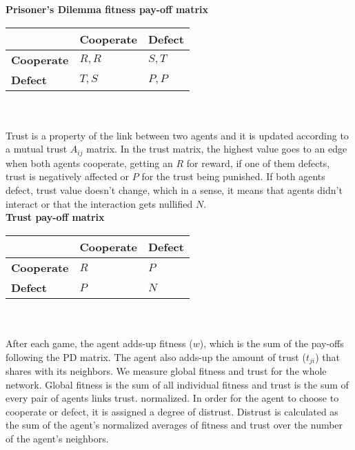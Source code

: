{\bf Prisoner's Dilemma fitness pay-off matrix}\\

\begin{tabular}{| l | l | l |}
\hline
          & \bf{Cooperate} & \bf{Defect} \\ \hline
\bf{Cooperate} &  $R,R$      &  $S,T$   \\ \hline
\bf{Defect}    &  $T,S$      &  $P,P$   \\ \hline

\end{tabular}\\ \\

Trust is a property of the link between two agents and it is updated
according to a mutual trust $A_{ij}$ matrix. In the trust matrix, the
highest value goes to an edge when both agents cooperate, getting an
$R$ for reward, if one of them defects, trust is negatively affected
or $P$ for the trust being punished. If both agents defect, trust
value doesn't change, which in a sense, it means that agents didn't
interact or that the interaction gets nullified $N$. \\

{\bf Trust pay-off matrix}\\

\begin{tabular}{| l | l | l |}
\hline
          & \bf{Cooperate} & \bf{Defect} \\ \hline
\bf{Cooperate} &  $R$      &  $P$   \\ \hline
\bf{Defect}    &  $P$      &  $N$   \\ \hline

\end{tabular}\\ \\


After each game, the agent adds-up fitness ($w$), which is the sum of the
pay-offs following the PD matrix. The agent also adds-up the amount of
trust ($t_{ji}$) that shares with its neighbors. We measure global
fitness and trust for the whole network. Global fitness is the sum of
all individual fitness and trust is the sum of every pair of agents
links trust. normalized. In order for the agent to choose to cooperate
or defect, it is assigned a degree of distrust. Distrust is
calculated as the sum of the agent's normalized averages of fitness
and trust over the number of the agent's neighbors.\\


